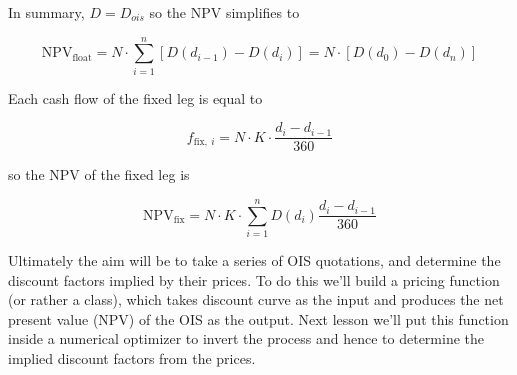 \documentclass[11pt]{article}
\begin{document}
In summary, \(D = D_{ois}\) so the NPV simplifies to

\[\mathrm{NPV}_{\mathrm{float}} = N\cdot\sum_{i=1}^{n}[D(d_{i-1}) - D(d_i)] = N \cdot [D(d_0) - D(d_n)]\]

Each cash flow of the fixed leg is equal to

\[f_{\mathrm{fix},~i}=N\cdot K\cdot \frac{d_i - d_{i-1}}{360}\]

so the NPV of the fixed leg is

\[\mathrm{NPV}_{\mathrm{fix}} = N\cdot K\cdot \sum_{i=1}^{n}D(d_{i})\frac{d_i - d_{i-1}}{360}\]

Ultimately the aim will be to take a series of OIS quotations, and
determine the discount factors implied by their prices. To do this we'll
build a pricing function (or rather a class), which takes discount curve
as the input and produces the net present value (NPV) of the OIS as the
output. Next lesson we'll put this function inside a numerical optimizer
to invert the process and hence to determine the implied discount
factors from the prices.
\end{document}
